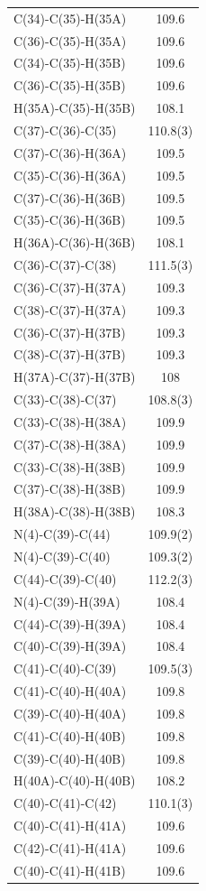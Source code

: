\begin{center}
{\begin{supertabular}{p{1.5in}c}
C(34)-C(35)-H(35A)&109.6\\
C(36)-C(35)-H(35A)&109.6\\
C(34)-C(35)-H(35B)&109.6\\
C(36)-C(35)-H(35B)&109.6\\
H(35A)-C(35)-H(35B)&108.1\\
C(37)-C(36)-C(35)&110.8(3)\\
C(37)-C(36)-H(36A)&109.5\\
C(35)-C(36)-H(36A)&109.5\\
C(37)-C(36)-H(36B)&109.5\\
C(35)-C(36)-H(36B)&109.5\\
H(36A)-C(36)-H(36B)&108.1\\
C(36)-C(37)-C(38)&111.5(3)\\
C(36)-C(37)-H(37A)&109.3\\
C(38)-C(37)-H(37A)&109.3\\
C(36)-C(37)-H(37B)&109.3\\
C(38)-C(37)-H(37B)&109.3\\
H(37A)-C(37)-H(37B)&108\\
C(33)-C(38)-C(37)&108.8(3)\\
C(33)-C(38)-H(38A)&109.9\\
C(37)-C(38)-H(38A)&109.9\\
C(33)-C(38)-H(38B)&109.9\\
C(37)-C(38)-H(38B)&109.9\\
H(38A)-C(38)-H(38B)&108.3\\
N(4)-C(39)-C(44)&109.9(2)\\
N(4)-C(39)-C(40)&109.3(2)\\
C(44)-C(39)-C(40)&112.2(3)\\
N(4)-C(39)-H(39A)&108.4\\
C(44)-C(39)-H(39A)&108.4\\
C(40)-C(39)-H(39A)&108.4\\
C(41)-C(40)-C(39)&109.5(3)\\
C(41)-C(40)-H(40A)&109.8\\
C(39)-C(40)-H(40A)&109.8\\
C(41)-C(40)-H(40B)&109.8\\
C(39)-C(40)-H(40B)&109.8\\
H(40A)-C(40)-H(40B)&108.2\\
C(40)-C(41)-C(42)&110.1(3)\\
C(40)-C(41)-H(41A)&109.6\\
C(42)-C(41)-H(41A)&109.6\\
C(40)-C(41)-H(41B)&109.6\\

\end{supertabular}}
\end{center}
